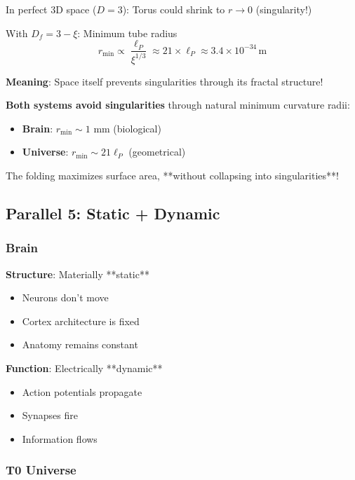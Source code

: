	In perfect 3D space ($D=3$): Torus could shrink to $r \to 0$ (singularity!)
	
	With $D_f = 3-\xi$: Minimum tube radius
	\begin{equation}
		r_{\min} \propto \frac{\ell_P}{\xi^{1/3}} \approx 21 \times \ell_P \approx 3.4 \times 10^{-34}\,\text{m}
	\end{equation}
	
	\textbf{Meaning}: Space itself prevents singularities through its fractal structure!
	
	\begin{keyresult}
		\textbf{Both systems avoid singularities} through natural minimum curvature radii:
		
		\begin{itemize}
			\item \textbf{Brain}: $r_{\min} \sim 1$ mm (biological)
			\item \textbf{Universe}: $r_{\min} \sim 21 \ell_P$ (geometrical)
		\end{itemize}
		
		The folding maximizes surface area, **without collapsing into singularities**!
	\end{keyresult}
	
	\subsection{Parallel 5: Static + Dynamic}
	
	\subsubsection{Brain}
	
	\textbf{Structure}: Materially **static**
	\begin{itemize}
		\item Neurons don't move
		\item Cortex architecture is fixed
		\item Anatomy remains constant
	\end{itemize}
	
	\textbf{Function}: Electrically **dynamic**
	\begin{itemize}
		\item Action potentials propagate
		\item Synapses fire
		\item Information flows
	\end{itemize}
	
	\subsubsection{T0 Universe}
	
